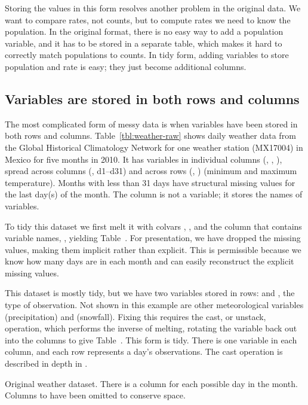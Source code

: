 \documentclass[article]{jss}
\begin{document}
Storing the values in this form resolves another problem in the original data. We want to compare rates, not counts, but to compute rates we need to know the population. In the original format, there is no easy way to add a population variable, and it has to be stored in a separate table, which makes it hard to correctly match populations to counts. In tidy form, adding variables to store population and rate is easy; they just become additional columns.

\subsection{Variables are stored in both rows and columns}

The most complicated form of messy data is when variables have been stored in both rows and columns. Table~\ref{tbl:weather-raw} shows daily weather data from the Global Historical Climatology Network for one weather station (MX17004) in Mexico for five months in 2010. It has variables in individual columns (, , ), spread across columns (, d1--d31) and across rows (, ) (minimum and maximum temperature). Months with less than 31 days have structural missing values for the last day(s) of the month. The  column is not a variable; it stores the names of variables.

To tidy this dataset we first melt it with colvars , ,  and the column that contains variable names, , yielding Table~. For presentation, we have dropped the missing values, making them implicit rather than explicit. This is permissible because we know how many days are in each month and can easily reconstruct the explicit missing values.

This dataset is mostly tidy, but we have two variables stored in rows:  and , the type of observation. Not shown in this example are other meteorological variables  (precipitation) and  (snowfall). Fixing this requires the cast, or unstack, operation, which performs the inverse of melting, rotating the  variable back out into the columns to give Table~. This form is tidy. There is one variable in each column, and each row represents a day's observations. The cast operation is described in depth in \citet{wickham:2007b}.

\begin{table}[htbp]
  \centering
  
  \caption{Original weather dataset.  There is a column for each possible day in the month.  Columns  to  have been omitted to conserve space.}
  \label{tbl:weather-raw}
\end{table}
\end{document}
